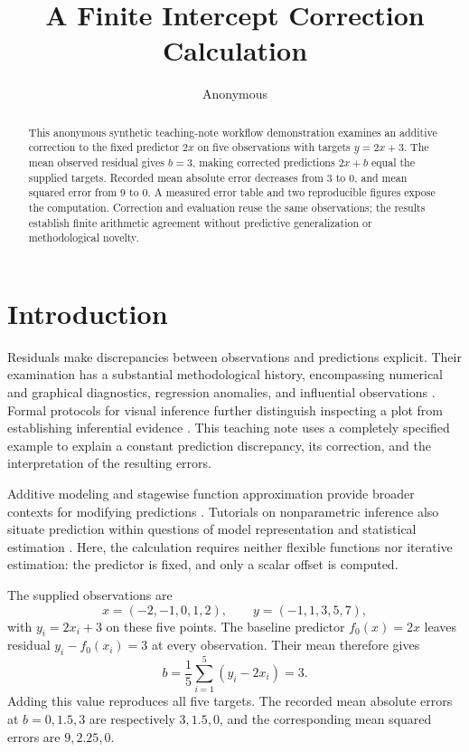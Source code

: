 \documentclass[11pt]{article}
\title{A Finite Intercept Correction Calculation}
\author{Anonymous}
\date{}
\begin{document}
\maketitle
\begin{abstract}
This anonymous synthetic teaching-note workflow demonstration examines an additive correction to the fixed predictor $2x$ on five observations with targets $y=2x+3$. The mean observed residual gives $b=3$, making corrected predictions $2x+b$ equal the supplied targets. Recorded mean absolute error decreases from $3$ to $0$, and mean squared error from $9$ to $0$. A measured error table and two reproducible figures expose the computation. Correction and evaluation reuse the same observations; the results establish finite arithmetic agreement without predictive generalization or methodological novelty.
\end{abstract}
\section{Introduction}

Residuals make discrepancies between observations and predictions explicit. Their examination has a substantial methodological history, encompassing numerical and graphical diagnostics, regression anomalies, and influential observations \cite{Anscombe1963ExaminationAnalysis,Denby1987ExampleUse,Chatterjee1986InfluentialObservations,Cook1977DetectionInfluential}. Formal protocols for visual inference further distinguish inspecting a plot from establishing inferential evidence \cite{Buja2009StatisticalInference}. This teaching note uses a completely specified example to explain a constant prediction discrepancy, its correction, and the interpretation of the resulting errors.

Additive modeling and stagewise function approximation provide broader contexts for modifying predictions \cite{Hastie1986GeneralizedAdditive,Friedman2001GreedyFunction}. Tutorials on nonparametric inference also situate prediction within questions of model representation and statistical estimation \cite{Geman1992NeuralNetworks}. Here, the calculation requires neither flexible functions nor iterative estimation: the predictor is fixed, and only a scalar offset is computed.

The supplied observations are
\[
x=(-2,-1,0,1,2), \qquad y=(-1,1,3,5,7),
\]
with $y_i=2x_i+3$ on these five points. The baseline predictor $f_0(x)=2x$ leaves residual $y_i-f_0(x_i)=3$ at every observation. Their mean therefore gives
\[
b=\frac{1}{5}\sum_{i=1}^{5}(y_i-2x_i)=3.
\]
Adding this value reproduces all five targets. The recorded mean absolute errors at $b=0,1.5,3$ are respectively $3,1.5,0$, and the corresponding mean squared errors are $9,2.25,0$.
\end{document}
